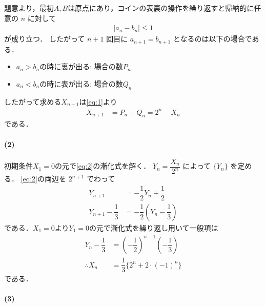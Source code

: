 \documentclass[../../main.tex]{subfiles}
\begin{document}
題意より，最初$A,B$は原点にあり，コインの表裏の操作を繰り返すと帰納的に任意の $n$ に対して
\begin{align}
  |a_n - b_n| \le 1
\end{align}
が成り立つ．
したがって $n+1$ 回目に $a_{n+1} = b_{n+1}$ となるのは以下の場合である．
\begin{itemize}
  \item $a_n>b_n$の時に裏が出る: 場合の数$P_n$ \\
  \item $a_n<b_n$の時に表が出る: 場合の数$Q_n$
\end{itemize}
したがって求める$X_{n+1}$は\cref{eq:1}より
\begin{align}
  X_{n+1} &= P_n + Q_n = 2^n - X_n \label{eq:2}
\end{align}
である．

\paragraph{(2)}

初期条件$X_1=0$の元で\cref{eq:2}の漸化式を解く．
$Y_n = \dfrac{X_n}{2^n}$ によって $\{Y_n\}$ を定める．
\cref{eq:2}の両辺を $2^{n+1}$ でわって
\begin{align}
  Y_{n+1} &= -\dfrac{1}{2}Y_n + \dfrac{1}{2} \\
  Y_{n+1} - \dfrac{1}{3} &= -\dfrac{1}{2}\left(Y_n - \dfrac{1}{3}\right)
\end{align}
である．$X_1=0$より$Y_1=0$の元で漸化式を繰り返し用いて一般項は
\begin{align}
  Y_n - \dfrac{1}{3} &= \left(-\dfrac{1}{2}\right)^{n-1}\left(-\dfrac{1}{3}\right) \\
  \therefore
  X_n &= \dfrac{1}{3} \{ 2^n + 2 \cdot (-1)^n \} \label{eq:3}
\end{align}
である．

\paragraph{(3)}
\end{document}
